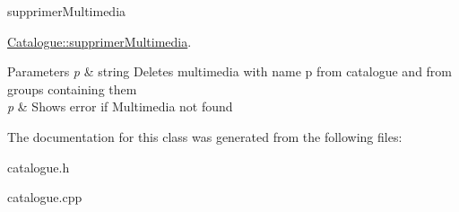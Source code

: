 supprimer\-Multimedia 

\hyperlink{classCatalogue_a88a9f6dcfac06d9a1eed7331ab3b1f40}{Catalogue\-::supprimer\-Multimedia}.


\begin{DoxyParams}{Parameters}
{\em p} & string Deletes multimedia with name p from catalogue and from groups containing them\\
\hline
{\em p} & Shows error if Multimedia not found \\
\hline
\end{DoxyParams}


The documentation for this class was generated from the following files\-:\begin{DoxyCompactItemize}
\item 
catalogue.\-h\item 
catalogue.\-cpp\end{DoxyCompactItemize}
